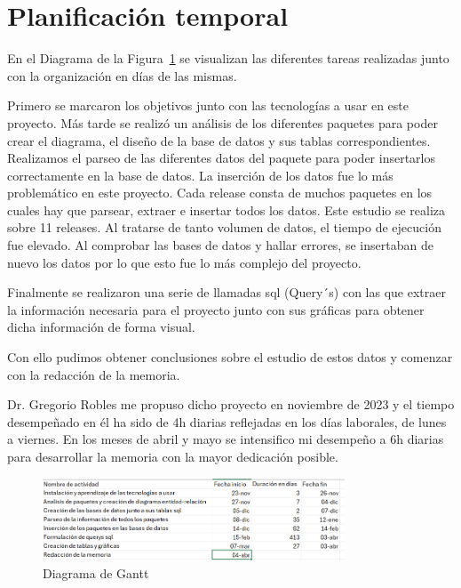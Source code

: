 \documentclass[a4paper, 12pt]{book}
\begin{document}
\section{Planificación temporal}
\label{sec:planificacion-temporal}

En el Diagrama de la Figura~\ref{fig:diagrama_gantt} se visualizan las diferentes tareas realizadas junto con la organización en días de las mismas. 

Primero se marcaron los objetivos junto con las tecnologías a usar en este proyecto.
Más tarde se realizó un análisis de los diferentes paquetes para poder crear el diagrama, el diseño de la base de datos y sus tablas correspondientes.
Realizamos el parseo de las diferentes datos del paquete para poder insertarlos correctamente en la base de datos.
La inserción de los datos fue lo más problemático en este proyecto. Cada release consta de muchos paquetes en los cuales hay que parsear, extraer e insertar todos los datos. Este estudio se realiza sobre 11 releases. Al tratarse de tanto volumen de datos, el tiempo de ejecución fue elevado. Al comprobar las bases de datos y hallar errores, se insertaban de nuevo los datos por lo que esto fue lo más complejo del proyecto.

Finalmente se realizaron una serie de llamadas sql (Query´s) con las que extraer la información necesaria para el proyecto junto con sus gráficas para obtener dicha información de forma visual.

Con ello pudimos obtener conclusiones sobre el estudio de estos datos y comenzar con la redacción de la memoria.

Dr. Gregorio Robles me propuso dicho proyecto en noviembre de 2023 y el tiempo desempeñado en él ha sido de 4h diarias reflejadas en los días laborales, de lunes a viernes. En los meses de abril y mayo se intensifico mi desempeño a 6h diarias para desarrollar la memoria con la mayor dedicación posible.

\begin{figure}
	\centering
	\includegraphics[width=9cm, keepaspectratio]{img/Gantt.png}
	\caption{Diagrama de Gantt}
	\label{fig:diagrama_gantt}
\end{figure}

\end{document}
